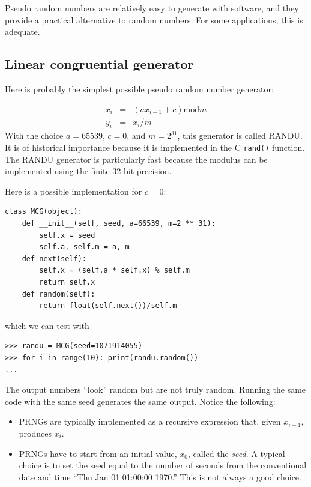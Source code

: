 \documentclass[justified, sixbynine]{tufte-book}
\def\ft{\small\tt}
\theoremstyle{plain}%
\newtheorem * {corollary}{Corollary}
\theoremstyle{definition}
\theoremstyle{remark}
\newtheorem * {remark}{Remark}
\newtheorem * {note}{Note}
\begin{document}
\begin{fullwidth}
Pseudo random numbers are relatively easy to generate with software, and they
provide a practical alternative to random numbers. For some applications, 
this is adequate.



\goodbreak\subsection{Linear congruential generator}

Here is probably the simplest possible pseudo random number generator:

\begin{eqnarray}
x_i &=&(a x_{i-1} + c) \textrm{mod}m \\
y_i &=&x_i/m
\end{eqnarray}
With the choice $a=65539$, $c=0$, and $m=2^{31}$, this generator is called RANDU. It is of historical importance
because it is implemented in the C {\ft rand()} function.
The RANDU generator is particularly fast because the modulus can
be implemented using the finite 32-bit precision.

Here is a possible implementation for $c=0$:
\begin{lstlisting}[caption={in file: {\ft nlib.py}}]
class MCG(object):
    def __init__(self, seed, a=66539, m=2 ** 31):
        self.x = seed
        self.a, self.m = a, m
    def next(self):
        self.x = (self.a * self.x) % self.m
        return self.x
    def random(self):
        return float(self.next())/self.m
\end{lstlisting}

which we can test with
\begin{lstlisting}
>>> randu = MCG(seed=1071914055)
>>> for i in range(10): print(randu.random())
...
\end{lstlisting}

The output numbers ``look'' random but are not truly random. Running the same code with the same seed generates the same output. Notice the following:

\begin{itemize}
\item  PRNGs are typically implemented as a recursive expression that, given $%
x_{i-1}$, produces $x_i$.



\item  PRNGs have to start from an initial value, $x_0$, called the {\it seed}.
A typical choice is to set the seed equal to the number of seconds from the
conventional date and time ``Thu Jan 01 01:00:00 1970.'' This is not always
a good choice.


\end{itemize}
\end{fullwidth}
\end{document}
